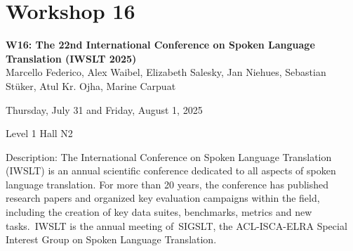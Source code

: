 \clearpage



\section[W16: The 22nd International Conference on Spoken Language Translation (IWSLT 2025)]{Workshop 16}
\label{workshop_16_1}
\label{workshop_16_2}

\begin{center}
    {\Large \textbf{W16: The 22nd International Conference on Spoken Language Translation (IWSLT 2025)}}\\
    

   Marcello Federico, Alex Waibel, Elizabeth Salesky, Jan Niehues, Sebastian Stüker, Atul Kr. Ojha, Marine Carpuat
    
    Thursday, July 31 and Friday, August 1, 2025
    
    Level 1 Hall N2

\end{center}

Description: The International Conference on Spoken Language Translation (IWSLT) is an annual scientific conference dedicated to all aspects of spoken language translation. For more than 20 years, the conference has published research papers and organized key evaluation campaigns within the field, including the creation of key data suites, benchmarks, metrics and new tasks. IWSLT is the annual meeting of SIGSLT, the ACL-ISCA-ELRA Special Interest Group on Spoken Language Translation.

